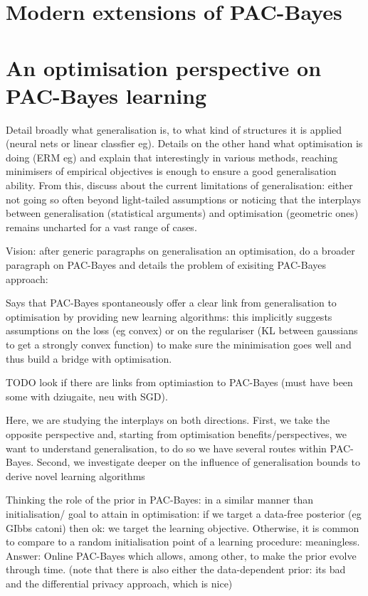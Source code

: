
\section{Modern extensions of PAC-Bayes}

\section{An optimisation perspective on PAC-Bayes learning}

\newpage
Detail broadly what generalisation is, to what kind of structures it is applied (neural nets or linear classfier eg). Details on the other hand what optimisation is doing (ERM eg) and explain that interestingly in various methods, reaching minimisers of empirical objectives is enough to ensure a good generalisation ability. From this, discuss about the current limitations of generalisation: either not going so often beyond light-tailed assumptions or noticing that the interplays between generalisation (statistical arguments) and optimisation (geometric ones) remains uncharted for a vast range of cases.

Vision: after generic paragraphs on generalisation an optimisation, do a broader paragraph on PAC-Bayes and details the problem of exisiting PAC-Bayes approach: 

Says that PAC-Bayes spontaneously offer a clear link from generalisation to optimisation by providing new learning algorithms: this implicitly suggests assumptions on the loss (eg convex) or on the regulariser (KL between gaussians to get a strongly convex function) to make sure the minimisation goes well and thus build a bridge with optimisation.

TODO look if there are links from optimiastion to PAC-Bayes (must have been some with dziugaite, neu with SGD).

Here, we are studying the interplays on both directions. First, we take the opposite perspective and, starting from optimisation benefits/perspectives, we want to understand generalisation, to do so we have several routes within PAC-Bayes. Second, we investigate deeper on the influence of generalisation bounds to derive novel learning algorithms

Thinking the role of the prior in PAC-Bayes: in a similar manner than initialisation/ goal to attain in optimisation: if we target a data-free posterior (eg GIbbs catoni) then ok: we target the learning objective. Otherwise, it is common to compare to a random initialisation point of a learning procedure: meaningless. Answer: Online PAC-Bayes which allows, among other, to make the prior evolve through time. (note that there is also either the data-dependent prior: its bad and the differential privacy approach, which is nice)

